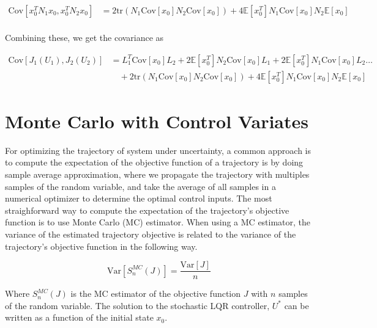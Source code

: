 \documentclass{article}
\begin{document}
$$
\begin{aligned}
  \text{Cov}[x_0^T N_1 x_0, x_0^T N_2 x_0] &= 2 \text{tr}(N_1 \text{Cov}[x_0] N_2 \text{Cov}[x_0]) + 4 \mathbb{E}[x_0^T]N_1\text{Cov}[x_0]N_2\mathbb{E}[x_0] \\
\end{aligned}
$$

Combining these, we get the covariance as

\begin{equation}
  \begin{aligned}
    \text{Cov}[J_1(U_1), J_2(U_2)] &= L_1^T \text{Cov}[x_0] L_2 + 2 \mathbb{E}[x_0^T] N_2 \text{Cov}[x_0] L_1 + 2 \mathbb{E}[x_0^T] N_1 \text{Cov}[x_0] L_2 \hdots \\
    & \quad + 2 \text{tr}(N_1 \text{Cov}[x_0] N_2 \text{Cov}[x_0]) + 4 \mathbb{E}[x_0^T]N_1\text{Cov}[x_0]N_2\mathbb{E}[x_0]
  \end{aligned}
\end{equation}

\section{Monte Carlo with Control Variates}

For optimizing the trajectory of system under uncertainty, a common approach is to compute the expectation of the objective
function of a trajectory is by doing sample average approximation, where we propagate the trajectory with multiples samples
of the random variable, and take the average of all samples in a numerical optimizer to determine the optimal control inputs.
The most straighforward way to compute the expectation of the trajectory's objective function is to use Monte Carlo (MC) estimator.
When using a MC estimator, the variance of the estimated trajectory objective is related to the variance of the trajectory's
objective function in the following way.

$$
\text{Var}[S_n^{MC}(J)] = \frac{\text{Var}[J]}{n}
$$

Where $S_n^{MC}(J)$ is the MC estimator of the objective function $J$ with $n$ samples of the random variable.
The solution to the stochastic LQR controller, $U^*$ can be written as a function of the initial state $x_0$.
\end{document}
